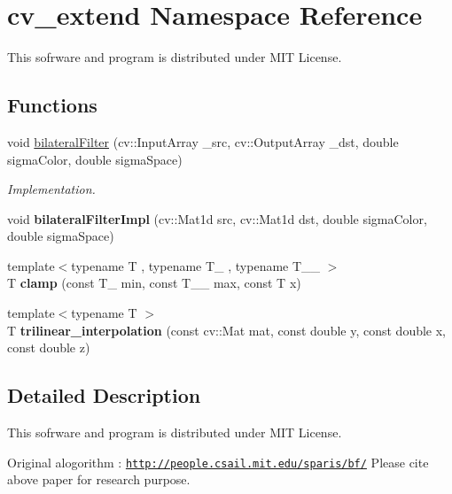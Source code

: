 \section{cv\+\_\+extend Namespace Reference}
\label{namespacecv__extend}


This sofrware and program is distributed under M\+IT License.  


\subsection*{Functions}
\begin{DoxyCompactItemize}
\item 
\mbox{\label{namespacecv__extend_a2bfc33f05bbb6e235e984b33647abe30}} 
void \hyperlink{namespacecv__extend_a2bfc33f05bbb6e235e984b33647abe30}{bilateral\+Filter} (cv\+::\+Input\+Array \+\_\+src, cv\+::\+Output\+Array \+\_\+dst, double sigma\+Color, double sigma\+Space)
\begin{DoxyCompactList}\small\item\em Implementation. \end{DoxyCompactList}\item 
\mbox{\label{namespacecv__extend_ad63779611742d7ce3b6cf45184734e39}} 
void {\bfseries bilateral\+Filter\+Impl} (cv\+::\+Mat1d src, cv\+::\+Mat1d dst, double sigma\+Color, double sigma\+Space)
\item 
\mbox{\label{namespacecv__extend_a27b3ee63437f807a97f75586e4478638}} 
{\footnotesize template$<$typename T , typename T\+\_\+ , typename T\+\_\+\+\_\+ $>$ }\\T {\bfseries clamp} (const T\+\_\+ min, const T\+\_\+\+\_\+ max, const T x)
\item 
\mbox{\label{namespacecv__extend_a7c5f8aaf3530641456744f464f3ed816}} 
{\footnotesize template$<$typename T $>$ }\\T {\bfseries trilinear\+\_\+interpolation} (const cv\+::\+Mat mat, const double y, const double x, const double z)
\end{DoxyCompactItemize}


\subsection{Detailed Description}
This sofrware and program is distributed under M\+IT License. 

Original alogorithm \+: \href{http://people.csail.mit.edu/sparis/bf/}{\tt http\+://people.\+csail.\+mit.\+edu/sparis/bf/} Please cite above paper for research purpose.

